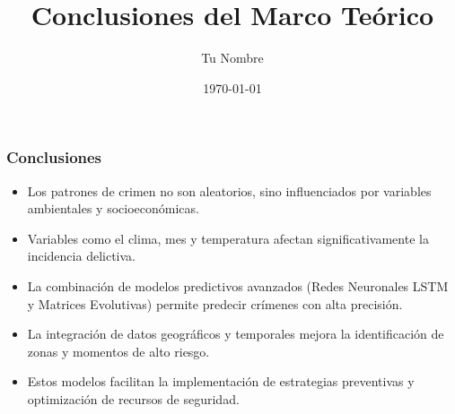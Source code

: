 \documentclass{beamer}
\title{Conclusiones del Marco Teórico}
\author{Tu Nombre}
\institute{Tu Universidad}
\date{\today}
\begin{document}
\frame{\titlepage}

\begin{frame}
\frametitle{Conclusiones}
\begin{itemize}
    \item Los patrones de crimen no son aleatorios, sino influenciados por variables ambientales y socioeconómicas.
    \item Variables como el clima, mes y temperatura afectan significativamente la incidencia delictiva.
    \item La combinación de modelos predictivos avanzados (Redes Neuronales LSTM y Matrices Evolutivas) permite predecir crímenes con alta precisión.
    \item La integración de datos geográficos y temporales mejora la identificación de zonas y momentos de alto riesgo.
    \item Estos modelos facilitan la implementación de estrategias preventivas y optimización de recursos de seguridad.
\end{itemize}
\end{frame}
\end{document}

